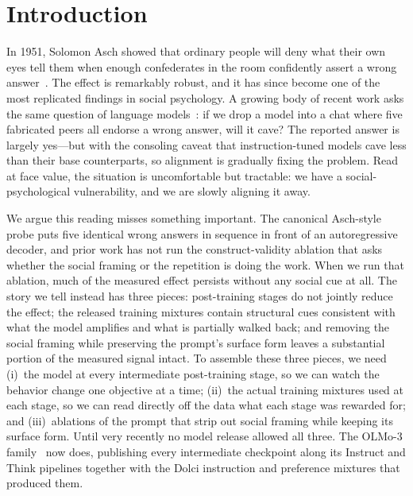 \documentclass[11pt]{article}
\begin{document}
\section{Introduction}
\label{sec:intro}

In 1951, Solomon Asch showed that ordinary people will deny what their own eyes tell them when enough confederates in the room confidently assert a wrong answer~\citep{asch1956}. The effect is remarkably robust, and it has since become one of the most replicated findings in social psychology. A growing body of recent work asks the same question of language models~\citep{zhu2025conformity, weng2025benchform, shoval2025psychiatric}: if we drop a model into a chat where five fabricated peers all endorse a wrong answer, will it cave? The reported answer is largely yes---but with the consoling caveat that instruction-tuned models cave less than their base counterparts, so alignment is gradually fixing the problem. Read at face value, the situation is uncomfortable but tractable: we have a social-psychological vulnerability, and we are slowly aligning it away.

We argue this reading misses something important. The canonical Asch-style probe puts five identical wrong answers in sequence in front of an autoregressive decoder, and prior work has not run the construct-validity ablation that asks whether the social framing or the repetition is doing the work. When we run that ablation, much of the measured effect persists without any social cue at all. The story we tell instead has three pieces: post-training stages do not jointly reduce the effect; the released training mixtures contain structural cues consistent with what the model amplifies and what is partially walked back; and removing the social framing while preserving the prompt's surface form leaves a substantial portion of the measured signal intact. To assemble these three pieces, we need (i)~the model at every intermediate post-training stage, so we can watch the behavior change one objective at a time; (ii)~the actual training mixtures used at each stage, so we can read directly off the data what each stage was rewarded for; and (iii)~ablations of the prompt that strip out social framing while keeping its surface form. Until very recently no model release allowed all three. The OLMo-3 family~\citep{olmo3} now does, publishing every intermediate checkpoint along its Instruct and Think pipelines together with the Dolci instruction and preference mixtures that produced them.
\end{document}
